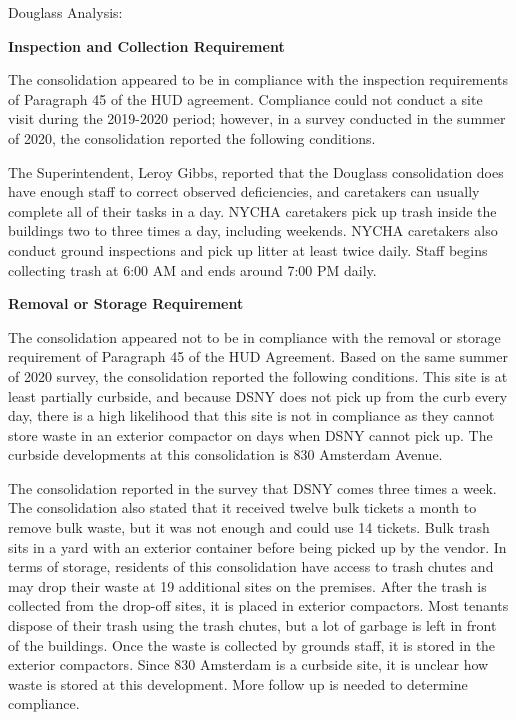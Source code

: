 Douglass Analysis: 

\textbf{Inspection and Collection Requirement} 

 

The consolidation appeared to be in compliance with the inspection requirements of Paragraph 45 of the HUD agreement. Compliance could not conduct a site visit during the 2019-2020 period; however, in a survey conducted in the summer of 2020, the consolidation reported the following conditions.

The Superintendent, Leroy Gibbs, reported that the Douglass consolidation does have enough staff to correct observed deficiencies, and caretakers can usually complete all of their tasks in a day. NYCHA caretakers pick up trash inside the buildings two to three times a day, including weekends. NYCHA caretakers also conduct ground inspections and pick up litter at least twice daily. Staff begins collecting trash at 6:00 AM and ends around 7:00 PM daily. 

\textbf{Removal or Storage Requirement} 

The consolidation appeared not to be in compliance with the removal or storage requirement of Paragraph  45 of the HUD Agreement. Based on the same summer of  2020 survey, the consolidation reported the following conditions. This site is at least partially curbside, and because DSNY does not pick up from the curb every day, there is a high likelihood that this site is not in compliance as they cannot store waste in an exterior compactor on days when DSNY cannot pick up. The curbside developments at this consolidation is 830 Amsterdam Avenue. 

 

The consolidation reported in the survey that DSNY comes three times a week. The consolidation also stated that it received twelve bulk tickets a month to remove bulk waste, but it was not enough and could use 14 tickets. Bulk trash sits in a yard with an exterior container before being picked up by the vendor. In terms of storage, residents of this consolidation have access to trash chutes and may drop their waste at 19 additional sites on the premises. After the trash is collected from the drop-off sites, it is placed in exterior compactors. Most tenants dispose of their trash using the trash chutes, but a lot of garbage is left in front of the buildings. Once the waste is collected by grounds staff, it is stored in the exterior compactors. Since 830 Amsterdam is a curbside site, it is unclear how waste is stored at this development. More follow up is needed to determine compliance.

